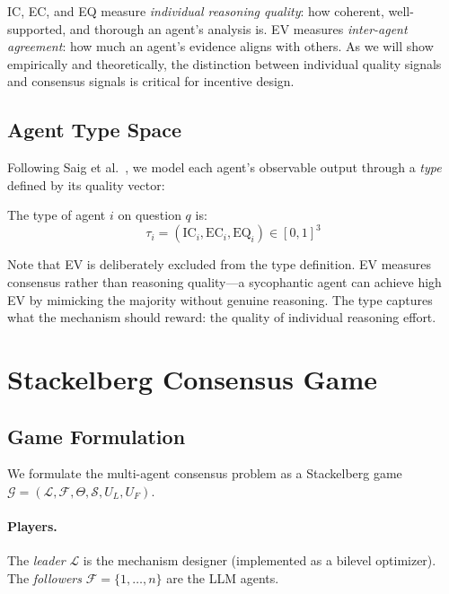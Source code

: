 \documentclass[runningheads]{llncs}
\begin{document}
IC, EC, and EQ measure \emph{individual reasoning quality}: how coherent, well-supported, and thorough an agent's analysis is. EV measures \emph{inter-agent agreement}: how much an agent's evidence aligns with others. As we will show empirically and theoretically, the distinction between individual quality signals and consensus signals is critical for incentive design.

\subsection{Agent Type Space}
\label{sec:type}

Following Saig et al.~\cite{saig2024incentivizing}, we model each agent's observable output through a \emph{type} defined by its quality vector:

\begin{definition}
The type of agent $i$ on question $q$ is:
\begin{equation}
    \tau_i = (\text{IC}_i, \text{EC}_i, \text{EQ}_i) \in [0,1]^3
\end{equation}
\end{definition}

Note that EV is deliberately excluded from the type definition. EV measures consensus rather than reasoning quality---a sycophantic agent can achieve high EV by mimicking the majority without genuine reasoning. The type captures what the mechanism should reward: the quality of individual reasoning effort.

\section{Stackelberg Consensus Game}
\label{sec:game}

\subsection{Game Formulation}

We formulate the multi-agent consensus problem as a Stackelberg game $\mathcal{G} = (\mathcal{L}, \mathcal{F}, \Theta, \mathcal{S}, U_L, U_F)$.

\paragraph{Players.} The \emph{leader} $\mathcal{L}$ is the mechanism designer (implemented as a bilevel optimizer). The \emph{followers} $\mathcal{F} = \{1, \ldots, n\}$ are the LLM agents.
\end{document}
